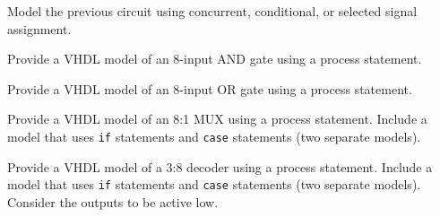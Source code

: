 \begin{my_num_list}
\item Model the previous circuit using concurrent, conditional, or selected signal assignment.
\item Provide a VHDL model of an 8-input AND gate using a process statement.
\item Provide a VHDL model of an 8-input OR gate using a process statement.
\item Provide a VHDL model of an 8:1 MUX using a process statement. Include a model that uses \texttt{if} statements and \texttt{case} statements (two separate models).
\item Provide a VHDL model of a 3:8 decoder using a process statement. Include a model that uses \texttt{if} statements and \texttt{case} statements (two separate models). Consider the outputs to be active low.
\end{my_num_list}

